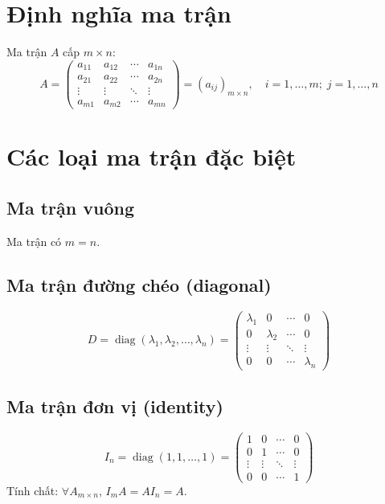 
\section{Định nghĩa ma trận}

Ma trận $A$ cấp $m \times n$:
\[
A = \begin{pmatrix}
a_{11} & a_{12} & \cdots & a_{1n} \\
a_{21} & a_{22} & \cdots & a_{2n} \\
\vdots & \vdots & \ddots & \vdots \\
a_{m1} & a_{m2} & \cdots & a_{mn}
\end{pmatrix}
= (a_{ij})_{m \times n}, \quad i = 1,\dots,m;\; j = 1,\dots,n
\]

\section{Các loại ma trận đặc biệt}

\subsection{Ma trận vuông}
Ma trận có $m = n$.

\subsection{Ma trận đường chéo (diagonal)}
\[
D = \operatorname{diag}(\lambda_1, \lambda_2, \dots, \lambda_n) =
\begin{pmatrix}
\lambda_1 & 0 & \cdots & 0 \\
0 & \lambda_2 & \cdots & 0 \\
\vdots & \vdots & \ddots & \vdots \\
0 & 0 & \cdots & \lambda_n
\end{pmatrix}
\]

\subsection{Ma trận đơn vị (identity)}
\[
I_n = \operatorname{diag}(1, 1, \dots, 1) =
\begin{pmatrix}
1 & 0 & \cdots & 0 \\
0 & 1 & \cdots & 0 \\
\vdots & \vdots & \ddots & \vdots \\
0 & 0 & \cdots & 1
\end{pmatrix}
\]
Tính chất: $\forall A_{m \times n}$, $I_m A = A I_n = A$.

